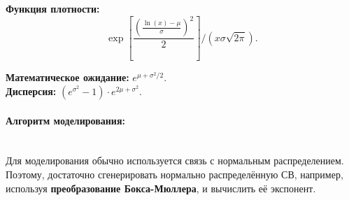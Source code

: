 \textbf{Функция плотности:}
\begin{equation}
	\exp\left[\frac{\left(\frac{\ln(x)-\mu}{\sigma}\right)^{2}}{2}\right]/\left(x\sigma\sqrt{2\pi}\right).
\end{equation}

\textbf{Математическое ожидание:} $e^{\mu+\sigma^{2}/2}$.\\

\textbf{Дисперсия:} $(e^{\sigma^{2}}-1)\cdot e^{2\mu+\sigma^{2}}$.

\paragraph{Алгоритм моделирования:}\
\\

Для моделирования обычно используется связь с нормальным распределением. Поэтому, достаточно сгенерировать нормально распределённую СВ, например, используя \textbf{преобразование Бокса-Мюллера}, и вычислить её экспонент.
